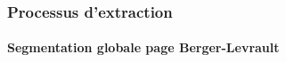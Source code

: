 \documentclass[9pt]{beamer}
\begin{document}
\begin{frame}
	\frametitle{Processus d'extraction}
	\framesubtitle{Segmentation globale page Berger-Levrault}
	\begin{columns}
		\begin{column}{5cm}
		\end{column}
		\begin{column}{5cm}
		\end{column}
	\end{columns}
\end{frame}
\end{document}
